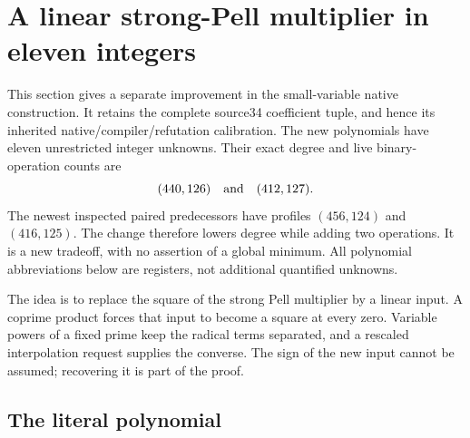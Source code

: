 \section{A linear strong-Pell multiplier in eleven integers}
\label{sec:linear-multiplier}

This section gives a separate improvement in the small-variable native
construction. It retains the complete source34 coefficient tuple, and hence
its inherited native/compiler/refutation calibration. The new polynomials
have eleven unrestricted integer unknowns. Their exact degree and live
binary-operation counts are
\[
  (440,126)\quad\hbox{and}\quad(412,127).
\]
The newest inspected paired predecessors have profiles $(456,124)$ and
$(416,125)$. The change therefore lowers degree while adding two operations.
It is a new tradeoff, with no assertion of a global minimum. All polynomial
abbreviations below are registers, not additional quantified unknowns.

The idea is to replace the square of the strong Pell multiplier by a linear
input. A coprime product forces that input to become a square at every zero.
Variable powers of a fixed prime keep the radical terms separated, and a
rescaled interpolation request supplies the converse. The sign of the new
input cannot be assumed; recovering it is part of the proof.

\subsection{The literal polynomial}

